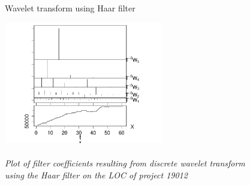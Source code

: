 \begin{figure}[H]
\caption{Wavelet transform using Haar filter}\label{figure:haar_filter}
\caption*{\\[1em]\footnotesize\emph{Plot of filter coefficients resulting from
discrete wavelet transform using the Haar filter on the LOC of project 19012}\rm}
\centering
	\includegraphics[width=196pt]{images/dwt_19012.pdf}
\end{figure}